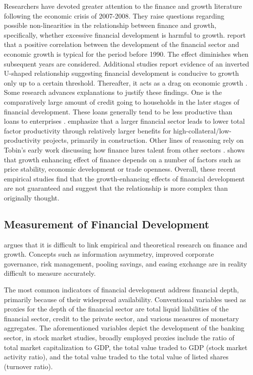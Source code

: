 \begin{refsection}
Researchers have devoted greater attention to the finance and growth literature following the economic crisis of 2007-2008. They raise questions regarding possible non-linearities in the relationship between finance and growth, specifically, whether excessive financial development is harmful to growth. \textcite{RousseauWachtel2011} report that a positive correlation between the development of the financial sector and economic growth is typical for the period before 1990. The effect diminishes when subsequent years are considered. Additional studies report evidence of an inverted U-shaped relationship suggesting financial development is conducive to growth only up to a certain threshold. Thereafter, it acts as a drag on economic growth \parencite{CecchettiKharroubi2012,Arcandetal2012,LawSingh2014}. Some research advances explanations to justify these findings. One is the comparatively large amount of credit going to households in the later stages of financial development. These loans generally tend to be less productive than loans to enterprises \parencite{Becketal2012}. \textcite{CecchettiKharroubi2013} emphasize that a larger financial sector leads to lower total factor productivity through relatively larger benefits for high-collateral/low-productivity projects, primarily in construction. Other lines of reasoning rely on Tobin's early work discussing how finance lures talent from other sectors \parencite{Boltonetal2011,CecchettiKharroubi2012,Kneer2013}. \textcite{Yilmazkuday} shows that growth enhancing effect of finance depends on a number of factors such as price stability, economic development or trade openness. Overall, these recent empirical studies find that the growth-enhancing effects of financial development are not guaranteed and suggest that the relationship is more complex than originally thought.

\subsection{Measurement of Financial Development}
\textcite{Levine2005} argues that it is difficult to link empirical and theoretical research on finance and growth. Concepts such as information asymmetry, improved corporate governance, risk management, pooling savings, and easing exchange are in reality difficult to measure accurately.

The most common indicators of financial development address financial depth, primarily because of their widespread availability. Conventional variables used as proxies for the depth of the financial sector are total liquid liabilities of the financial sector, credit to the private sector, and various measures of monetary aggregates. The aforementioned variables depict the development of the banking sector, in stock market studies, broadly employed proxies include the ratio of total market capitalization to GDP, the total value traded to GDP (stock market activity ratio), and the total value traded to the total value of listed shares (turnover ratio).  


\end{refsection}
